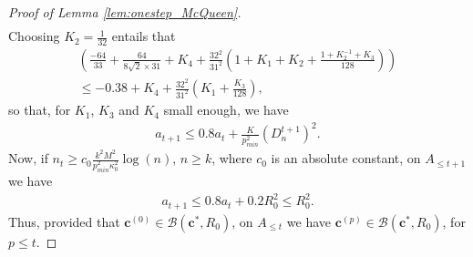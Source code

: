 \documentclass[noinfoline,preprint]{article}
\newcommand{\cb}{\mathbf{c}}
\renewcommand{\1}{\mathds 1}
\begin{document}
\begin{proof}[Proof of Lemma \ref{lem:onestep_McQueen}]
\begin{multline*}
\end{multline*}
Choosing $K_2= \frac{1}{32}$ entails that
\begin{multline*}
\left( \frac{-64}{33} + \frac{64}{8\sqrt{2} \times 31} + K_4 +\frac{32^2}{31^2} \left ( 1 + K_1 + K_2 + \frac{1 + K_2^{-1} + K_3}{128} \right ) \right) \\
 \leq -0.38 + K_4 + \frac{32^2}{31^2} \left ( K_1  + \frac{ K_3}{128} \right ),
\end{multline*}
so that, for $K_1$, $K_3$ and $K_4$ small enough, we have
\begin{align*}
a_{t+1} \leq 0.8 a_t + \frac{K}{p_{min}^2} (D_n^{t+1})^2.
\end{align*} 
Now, if $n_t \geq c_0 \frac{k^2M^2}{p_{min}^2 \kappa_0^2} \log(n)$, $n \geq k$, where $c_0$ is  an absolute constant, on $A_{\leq t+1}$ we have
\begin{align*}
a_{t+1} \leq 0.8 a_t + 0.2 R_0^2 \leq R_0^2. 
\end{align*}
Thus, provided that $\cb^{(0)} \in \mathcal{B}(\cb^*,R_0)$, on $A_{\leq t}$ we have $\cb^{(p)} \in \mathcal{B}(\cb^*,R_0)$, for $ p \leq t$.



\end{proof}
\end{document}
